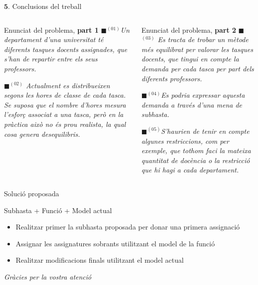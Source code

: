 \documentclass[twocolumn]{beamer}
\begin{document}
\begin{frame}{$\mathbf{5.}$ Conclusions del treball}
\begin{columns}[t]
	\begin{column}{.5\textwidth}
	\begin{block}{Enunciat del problema, \textbf{part 1}}
		\small
		\textit{{\color{cyan!60}$\blacksquare$}$^{(01)}${\color{black!80}Un departament d'una universitat té diferents tasques docents assignades, que s'han de repartir entre els seus professors.}}
		
		\textit{{\color{blue!60}$\blacksquare$}$^{(02)}$ Actualment es distribueixen segons les hores de classe de cada tasca. Se suposa que el nombre d'hores mesura l'esforç associat a una tasca, però en la pràctica això no és prou realista, la qual cosa genera desequilibris.}
	\end{block}
	\end{column}
	\begin{column}{.5\textwidth}
		\begin{block}{Enunciat del problema, \textbf{part 2}}
			\small	
			\textit{{\color{green!60}$\blacksquare$}$^{(03)}$ {\color{black!80}Es tracta de trobar un mètode més equilibrat per valorar les tasques docents, que tingui en compte la demanda per cada tasca per part dels diferents professors.}}
			
			\textit{{\color{purple!60}$\blacksquare$}$^{(04)}$Es podria expressar aquesta demanda a través d'una mena de subhasta.}
			
			\textit{{\color{violet!60}$\blacksquare$}$^{(05)}${\color{black!80}S'haurien de tenir en compte algunes restriccions, com per exemple, que tothom faci la mateixa quantitat de docència o la restricció que hi hagi a cada departament.}}
		\end{block}
	\end{column}
\end{columns}
\end{frame}

\begin{frame}{Solució proposada}
\begin{block}{Subhasta + Funció + Model actual}
	\begin{itemize}
		\item Realitzar primer la subhasta proposada per donar una primera assignació
		\item Assignar les assignatures sobrants utilitzant el model de la funció
		\item Realitzar modificacions finals utilitzant el model actual
	\end{itemize}
\end{block}
\end{frame}

\begin{frame}
\textit{\color{redviolet} \Huge Gràcies per la vostra atenció}
\end{frame}
\end{document}
